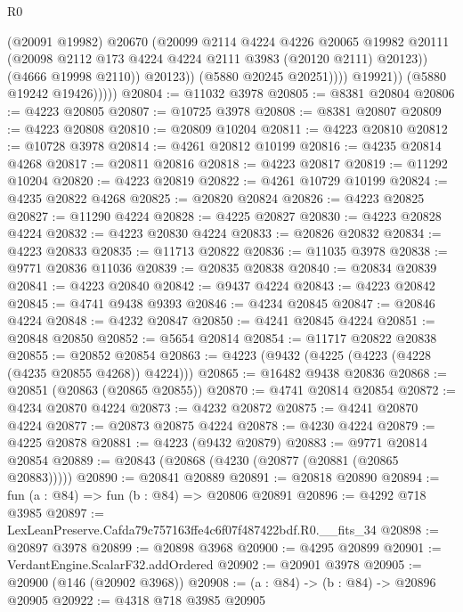 \begin{lexlean}{R0}
\begin{coremodule}
                            (@20091 @19982)
                            @20670
                            (@20099
                              @2114
                              @4224
                              @4226
                              @20065
                              @19982
                              @20111
                              (@20098 @2112 @173 @4224 @4224 @2111 @3983 (@20120 @2111) @20123))
                            (@4666 @19998 @2110))
                          @20123))
                      (@5880 @20245 @20251))))
                @19921))
            (@5880 @19242 @19426)))))
@20804 := @11032 @3978
@20805 := @8381 @20804
@20806 := @4223 @20805
@20807 := @10725 @3978
@20808 := @8381 @20807
@20809 := @4223 @20808
@20810 := @20809 @10204
@20811 := @4223 @20810
@20812 := @10728 @3978
@20814 := @4261 @20812 @10199
@20816 := @4235 @20814 @4268
@20817 := @20811 @20816
@20818 := @4223 @20817
@20819 := @11292 @10204
@20820 := @4223 @20819
@20822 := @4261 @10729 @10199
@20824 := @4235 @20822 @4268
@20825 := @20820 @20824
@20826 := @4223 @20825
@20827 := @11290 @4224
@20828 := @4225 @20827
@20830 := @4223 @20828 @4224
@20832 := @4223 @20830 @4224
@20833 := @20826 @20832
@20834 := @4223 @20833
@20835 := @11713 @20822
@20836 := @11035 @3978
@20838 := @9771 @20836 @11036
@20839 := @20835 @20838
@20840 := @20834 @20839
@20841 := @4223 @20840
@20842 := @9437 @4224
@20843 := @4223 @20842
@20845 := @4741 @9438 @9393
@20846 := @4234 @20845
@20847 := @20846 @4224
@20848 := @4232 @20847
@20850 := @4241 @20845 @4224
@20851 := @20848 @20850
@20852 := @5654 @20814
@20854 := @11717 @20822 @20838
@20855 := @20852 @20854
@20863 := @4223 (@9432 (@4225 (@4223 (@4228 (@4235 @20855 @4268)) @4224)))
@20865 := @16482 @9438 @20836
@20868 := @20851 (@20863 (@20865 @20855))
@20870 := @4741 @20814 @20854
@20872 := @4234 @20870 @4224
@20873 := @4232 @20872
@20875 := @4241 @20870 @4224
@20877 := @20873 @20875 @4224
@20878 := @4230 @4224
@20879 := @4225 @20878
@20881 := @4223 (@9432 @20879)
@20883 := @9771 @20814 @20854
@20889 := @20843 (@20868 (@4230 (@20877 (@20881 (@20865 @20883)))))
@20890 := @20841 @20889
@20891 := @20818 @20890
@20894 := fun (a : @84) => fun (b : @84) => @20806 @20891
@20896 := @4292 @718 @3985
@20897 := LexLeanPreserve.Cafda79c757163ffe4c6f07f487422bdf.R0.__fits_34
@20898 := @20897 @3978
@20899 := @20898 @3968
@20900 := @4295 @20899
@20901 := VerdantEngine.ScalarF32.addOrdered
@20902 := @20901 @3978
@20905 := @20900 (@146 (@20902 @3968))
@20908 := (a : @84) -> (b : @84) -> @20896 @20905
@20922 := @4318
    @718
    @3985
    @20905

\end{coremodule}
\end{lexlean}
